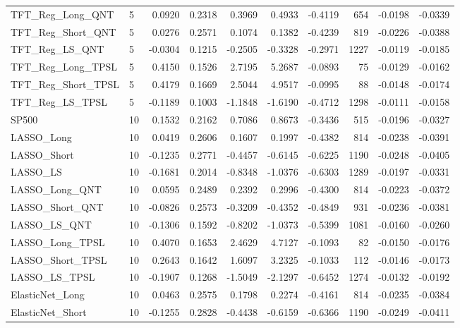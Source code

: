 \begin{tabular}{llrrrrrrrr}
\cline{1-10}
TFT\_Reg\_Long\_QNT & 5 & 0.0920 & 0.2318 & 0.3969 & 0.4933 & -0.4119 & 654 & -0.0198 & -0.0339 \\
\cline{1-10}
TFT\_Reg\_Short\_QNT & 5 & 0.0276 & 0.2571 & 0.1074 & 0.1382 & -0.4239 & 819 & -0.0226 & -0.0388 \\
\cline{1-10}
TFT\_Reg\_LS\_QNT & 5 & -0.0304 & 0.1215 & -0.2505 & -0.3328 & -0.2971 & 1227 & -0.0119 & -0.0185 \\
\cline{1-10}
TFT\_Reg\_Long\_TPSL & 5 & 0.4150 & 0.1526 & 2.7195 & 5.2687 & -0.0893 & 75 & -0.0129 & -0.0162 \\
\cline{1-10}
TFT\_Reg\_Short\_TPSL & 5 & 0.4179 & 0.1669 & 2.5044 & 4.9517 & -0.0995 & 88 & -0.0148 & -0.0174 \\
\cline{1-10}
TFT\_Reg\_LS\_TPSL & 5 & -0.1189 & 0.1003 & -1.1848 & -1.6190 & -0.4712 & 1298 & -0.0111 & -0.0158 \\
\cline{1-10}
SP500 & 10 & 0.1532 & 0.2162 & 0.7086 & 0.8673 & -0.3436 & 515 & -0.0196 & -0.0327 \\
\cline{1-10}
LASSO\_Long & 10 & 0.0419 & 0.2606 & 0.1607 & 0.1997 & -0.4382 & 814 & -0.0238 & -0.0391 \\
\cline{1-10}
LASSO\_Short & 10 & -0.1235 & 0.2771 & -0.4457 & -0.6145 & -0.6225 & 1190 & -0.0248 & -0.0405 \\
\cline{1-10}
LASSO\_LS & 10 & -0.1681 & 0.2014 & -0.8348 & -1.0376 & -0.6303 & 1289 & -0.0197 & -0.0331 \\
\cline{1-10}
LASSO\_Long\_QNT & 10 & 0.0595 & 0.2489 & 0.2392 & 0.2996 & -0.4300 & 814 & -0.0223 & -0.0372 \\
\cline{1-10}
LASSO\_Short\_QNT & 10 & -0.0826 & 0.2573 & -0.3209 & -0.4352 & -0.4849 & 931 & -0.0236 & -0.0381 \\
\cline{1-10}
LASSO\_LS\_QNT & 10 & -0.1306 & 0.1592 & -0.8202 & -1.0373 & -0.5399 & 1081 & -0.0160 & -0.0260 \\
\cline{1-10}
LASSO\_Long\_TPSL & 10 & 0.4070 & 0.1653 & 2.4629 & 4.7127 & -0.1093 & 82 & -0.0150 & -0.0176 \\
\cline{1-10}
LASSO\_Short\_TPSL & 10 & 0.2643 & 0.1642 & 1.6097 & 3.2325 & -0.1033 & 112 & -0.0146 & -0.0173 \\
\cline{1-10}
LASSO\_LS\_TPSL & 10 & -0.1907 & 0.1268 & -1.5049 & -2.1297 & -0.6452 & 1274 & -0.0132 & -0.0192 \\
\cline{1-10}
ElasticNet\_Long & 10 & 0.0463 & 0.2575 & 0.1798 & 0.2274 & -0.4161 & 814 & -0.0235 & -0.0384 \\
\cline{1-10}
ElasticNet\_Short & 10 & -0.1255 & 0.2828 & -0.4438 & -0.6159 & -0.6366 & 1190 & -0.0249 & -0.0411 \\

\end{tabular}
